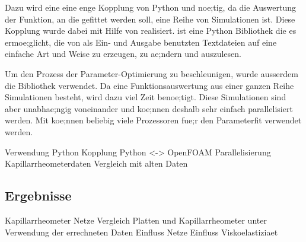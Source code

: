 Dazu wird eine eine enge Kopplung von Python und \openfoam{} noe;tig, da die Auswertung der Funktion, an die gefittet werden soll, eine Reihe von Simulationen ist.
Diese Kopplung wurde dabei mit Hilfe von   realisiert.  ist eine Python Bibliothek die es ermoe;glicht, die von \openfoam{} als Ein- und Ausgabe benutzten Textdateien auf eine einfache Art und Weise zu erzeugen, zu ae;ndern und auszulesen.

Um den Prozess der Parameter-Optimierung zu beschleunigen, wurde ausserdem die Bibliothek   verwendet. Da eine Funktionsauswertung aus einer ganzen Reihe Simulationen besteht, wird dazu viel Zeit benoe;tigt. Diese Simulationen sind aber unabhae;ngig voneinander und koe;nnen deshalb sehr einfach parallelisiert werden. Mit  koe;nnen beliebig viele Prozessoren fue;r den Parameterfit verwendet werden.
%
\begin{todocontent}
    \1 Verwendung Python
    \1 Kopplung Python <-> OpenFOAM
    \1 Parallelisierung
    \1 Kapillarrheometerdaten
    \1 Vergleich mit alten Daten
\end{todocontent}
%
\subsection{Ergebnisse}
\begin{todocontent}
    \1 Kapillarrheometer Netze
    \1 Vergleich Platten und Kapillarrheometer unter Verwendung der errechneten Daten
    \1 Einfluss Netze
    \1 Einfluss Viskoelastiziaet
\end{todocontent}
%
